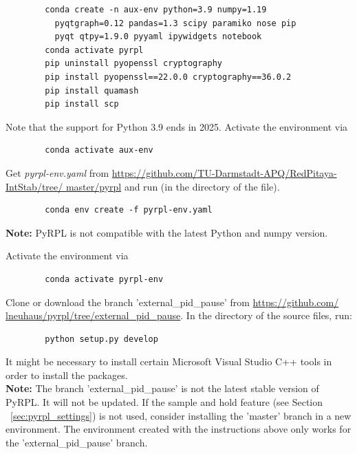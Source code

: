 \documentclass[twoside,a4paper]{refart}
\begin{document}
\begin{tcolorbox}
	\begin{verbatim}
		conda create -n aux-env python=3.9 numpy=1.19
		  pyqtgraph=0.12 pandas=1.3 scipy paramiko nose pip 
		  pyqt qtpy=1.9.0 pyyaml ipywidgets notebook
		conda activate pyrpl
		pip uninstall pyopenssl cryptography
		pip install pyopenssl==22.0.0 cryptography==36.0.2
		pip install quamash
		pip install scp
	\end{verbatim}
\end{tcolorbox}

Note that the support for Python 3.9 ends in 2025. Activate the environment via

\begin{tcolorbox}
	\begin{verbatim}
		conda activate aux-env
	\end{verbatim}
\end{tcolorbox}

Get \textit{pyrpl-env.yaml} from \href{https://github.com/TU-Darmstadt-APQ/RedPitaya-IntStab/tree/master/pyrpl}{https://github.com/TU-Darmstadt-APQ/RedPitaya-IntStab/tree/ master/pyrpl} and run (in the directory of the file).

\begin{tcolorbox}
	\begin{verbatim}
		conda env create -f pyrpl-env.yaml
	\end{verbatim}
\end{tcolorbox}

\textbf{Note:}  PyRPL is not compatible with the latest Python and numpy version.


Activate the environment via 
\begin{tcolorbox}
	\begin{verbatim}
		conda activate pyrpl-env
	\end{verbatim}
\end{tcolorbox}
Clone or download the branch 'external\_pid\_pause' from \href{https://github.com/lneuhaus/pyrpl/tree/external_pid_pause}{https://github.com/ lneuhaus/pyrpl/tree/external\_pid\_pause}. In the directory of the source files, run:

\begin{tcolorbox}
	\begin{verbatim}
		python setup.py develop
	\end{verbatim}
\end{tcolorbox}

It might be necessary to install certain Microsoft Visual Studio C++ tools in order to install the packages. \\
\textbf{Note:} The branch 'external\_pid\_pause' is not the latest stable version of PyRPL. It will not be updated. If the sample and hold feature (see Section ~\ref{sec:pyrpl_settings}) is not used, consider installing the 'master' branch in a new environment. The environment created with the instructions above only works for the  'external\_pid\_pause' branch. 
\end{document}
